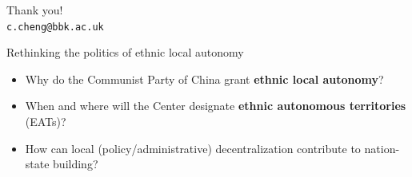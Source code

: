 \documentclass[
  10pt,
  ignorenonframetext,
]{beamer}
\begin{document}
\begin{frame}
\vspace{0.7cm}

Thank you!\\
\vspace{0.7cm} \texttt{c.cheng@bbk.ac.uk}
\end{frame}

\begin{frame}{Rethinking the politics of ethnic local autonomy}
\label{rethinking-the-politics-of-ethnic-local-autonomy}
\begin{itemize}
  \item Why do the Communist Party of China grant \textbf{ethnic local autonomy}?
  \vspace{0.5cm}
  \item When and where will the Center designate \textbf{ethnic autonomous territories} (EATs)?
  \vspace{0.5cm}
  \item How can local (policy/administrative) decentralization contribute to nation-state building?
\end{itemize}
\end{frame}
\end{document}
